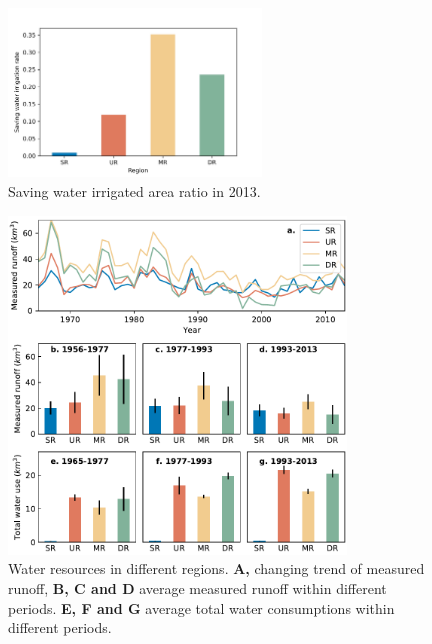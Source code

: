 \documentclass[9pt,twoside,lineno]{pnas-new}
\begin{document}
\begin{figure}
    \centering
    \includegraphics[width=0.6\textwidth]{../../figures/sup/saving_water.jpg}
    \caption{
        Saving water irrigated area ratio in 2013.
    }
\end{figure}


\begin{figure}
    \centering
    \includegraphics[width=0.8\textwidth]{../../figures/sup/sf_measured_runoff.pdf}
    \caption{Water resources in different regions. 
        \textbf{A,} changing trend of measured runoff, 
        \textbf{B, C and D} average measured runoff within different periods.
        \textbf{E, F and G} average total water consumptions within different periods. 
    }
\end{figure}
\end{document}
